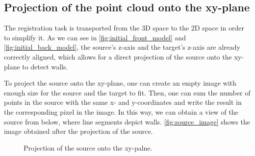         \subsection{Projection of the point cloud onto the xy-plane}
        \label{sub:Projection of the point cloud onto the xy-plane}
            The registration task is transported from the 3D space to the 2D space in order to simplify it.
            As we can see in \autoref{fig:initial_front_model} and \autoref{fig:initial_back_model}, 
            the source’s z-axis and the target’s z-axis are already correctly aligned, 
            which allows for a direct projection of the source onto the xy-plane to detect walls.

            To project the source onto the xy-plane, one can create an empty image with enough size for the source and the target to fit.
            Then, one can sum the number of points in the source with the same x- and y-coordinates and write the result in the corresponding pixel in the image.
            In this way, we can obtain a view of the source from below, where line segments depict walls.
            \autoref{fig:source_image} shows the image obtained after the projection of the source.
            
            \begin{figure}[htp]
                \centering
                \caption{Projection of the source onto the xy-palne.}
                \label{fig:source_image}
            \end{figure}

